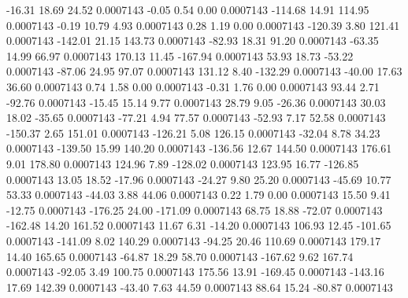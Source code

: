       -16.31       18.69       24.52     0.0007143
       -0.05        0.54        0.00     0.0007143
     -114.68       14.91      114.95     0.0007143
       -0.19       10.79        4.93     0.0007143
        0.28        1.19        0.00     0.0007143
     -120.39        3.80      121.41     0.0007143
     -142.01       21.15      143.73     0.0007143
      -82.93       18.31       91.20     0.0007143
      -63.35       14.99       66.97     0.0007143
      170.13       11.45     -167.94     0.0007143
       53.93       18.73      -53.22     0.0007143
      -87.06       24.95       97.07     0.0007143
      131.12        8.40     -132.29     0.0007143
      -40.00       17.63       36.60     0.0007143
        0.74        1.58        0.00     0.0007143
       -0.31        1.76        0.00     0.0007143
       93.44        2.71      -92.76     0.0007143
      -15.45       15.14        9.77     0.0007143
       28.79        9.05      -26.36     0.0007143
       30.03       18.02      -35.65     0.0007143
      -77.21        4.94       77.57     0.0007143
      -52.93        7.17       52.58     0.0007143
     -150.37        2.65      151.01     0.0007143
     -126.21        5.08      126.15     0.0007143
      -32.04        8.78       34.23     0.0007143
     -139.50       15.99      140.20     0.0007143
     -136.56       12.67      144.50     0.0007143
      176.61        9.01      178.80     0.0007143
      124.96        7.89     -128.02     0.0007143
      123.95       16.77     -126.85     0.0007143
       13.05       18.52      -17.96     0.0007143
      -24.27        9.80       25.20     0.0007143
      -45.69       10.77       53.33     0.0007143
      -44.03        3.88       44.06     0.0007143
        0.22        1.79        0.00     0.0007143
       15.50        9.41      -12.75     0.0007143
     -176.25       24.00     -171.09     0.0007143
       68.75       18.88      -72.07     0.0007143
     -162.48       14.20      161.52     0.0007143
       11.67        6.31      -14.20     0.0007143
      106.93       12.45     -101.65     0.0007143
     -141.09        8.02      140.29     0.0007143
      -94.25       20.46      110.69     0.0007143
      179.17       14.40      165.65     0.0007143
      -64.87       18.29       58.70     0.0007143
     -167.62        9.62      167.74     0.0007143
      -92.05        3.49      100.75     0.0007143
      175.56       13.91     -169.45     0.0007143
     -143.16       17.69      142.39     0.0007143
      -43.40        7.63       44.59     0.0007143
       88.64       15.24      -80.87     0.0007143
